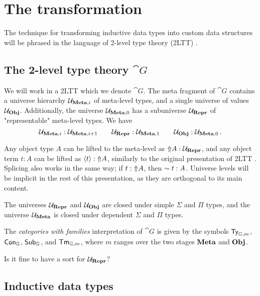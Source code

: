 \section{The transformation}\label{sec:prelim}

The technique for transforming inductive data types into custom data structures
will be phrased in the language of 2-level type theory (2LTT)
\cite{Kovacs2022-vb}. 

\subsection{The 2-level type theory $\cat{G}$}

We will work in a 2LTT which we denote $\cat{G}$. The meta fragment of
$\cat{G}$ contains a universe hierarchy ${\mathcal{U}_{{\textbf{Meta},i}}}$ of meta-level
types, and a single universe of values ${{\mathcal{U}_{{\textbf{Obj}}}}}$. Additionally, the universe
${\mathcal{U}_{{\textbf{Meta},0}}}$ has a subuniverse ${{\mathcal{U}_{{\textbf{Repr}}}}}$ of "representable" meta-level
types. We have
\[
  {\mathcal{U}_{{\textbf{Meta},i}}} : {\mathcal{U}_{{\textbf{Meta},i+1}}} \qquad {{\mathcal{U}_{{\textbf{Repr}}}}} : {\mathcal{U}_{{\textbf{Meta},1}}} \qquad {{\mathcal{U}_{{\textbf{Obj}}}}} : {\mathcal{U}_{{\textbf{Meta},0}}} \,.
\]

Any object type $A$ can be lifted to the meta-level as $\text{$\Uparrow$}{A} : {{\mathcal{U}_{{\textbf{Repr}}}}}$, and any
object term $t : A$ can be lifted as $\langle{t}\rangle : \text{$\Uparrow$}{A}$, similarly to the
original presentation of 2LTT \cite{Kovacs2022-vb}. Splicing also works in the
same way; if $t : \text{$\Uparrow$}{A}$, then $\text{$\sim{t}$} : A$. Universe levels will be
implicit in the rest of this presentation, as they are orthogonal to its main
content. 

The universes ${{\mathcal{U}_{{\textbf{Repr}}}}}$ and ${{\mathcal{U}_{{\textbf{Obj}}}}}$ are closed under simple $\Sigma$ and $\Pi$ types,
and the universe ${{\mathcal{U}_{{\textbf{Meta}}}}}$ is closed under dependent $\Sigma$ and $\Pi$ types. 

The \emph{categories with families} interpretation of $\cat{G}$ is given by the
symbols ${\textsf{Ty}}_{\mathbb{G},m}$, ${\textsf{Con}}_{\mathbb{G}}$, ${\textsf{Sub}}_{\mathbb{G}}$, and
${\textsf{Tm}}_{\mathbb{G},m}$, where $m$ ranges over the two stages $\textbf{Meta}$ and
$\textbf{Obj}$.

Is it fine to have a sort for ${{\mathcal{U}_{{\textbf{Repr}}}}}$?

\subsection{Inductive data types}

